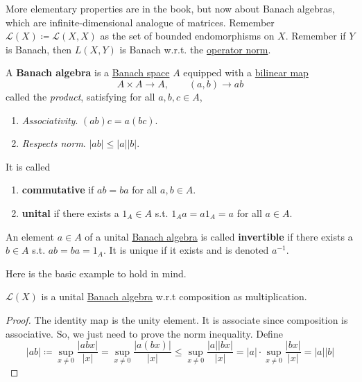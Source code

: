 	More elementary properties are in the book, but now about Banach algebras, which are infinite-dimensional analogue of matrices. Remember $\mathcal{L}(X) \coloneqq \mathcal{L}(X, X)$ as the set of bounded endomorphisms on $X$. Remember if $Y$ is Banach, then $L(X, Y)$ is Banach w.r.t. the \hyperref[lin-def:operator-norm-2]{operator norm}. 

	\begin{definition}
	  \label{def:banach-algebra}
	  A \textbf{Banach algebra} is a \hyperref[mv-def:banach-space]{Banach space} $A$ equipped with a \hyperref[lin-def:bilinear-map]{bilinear map} 
		\begin{equation}
		  A \times A \to A, \qquad (a, b) \to ab
		\end{equation}
		called the \textit{product}, satisfying for all $a, b, c \in A$, 
		\begin{enumerate}
		  \item \textit{Associativity}. $(ab)c = a(bc)$. 
			\item \textit{Respects norm}. $|ab| \leq |a| |b|$. 
		\end{enumerate}
		It is called 
		\begin{enumerate}
		  \item \textbf{commutative} if $ab = ba$ for all $a, b \in A$. 
			\item \textbf{unital} if there exists a $1_A \in A$ s.t. $1_A a = a 1_A = a$ for all $a \in A$. 
		\end{enumerate}
	\end{definition}

	\begin{definition}
	  \label{def:invertible-element-of-a-banach-algebra}
		An element $a \in A$ of a unital \hyperref[def:banach-algebra]{Banach algebra} is called \textbf{invertible} if there exists a $b \in A$ s.t. $ab = ba = 1_A$. It is unique if it exists and is denoted $a^{-1}$. 
	\end{definition}

	Here is the basic example to hold in mind. 

	\begin{theorem}
	  \label{thm:banach-algebra-of-bounded-linear-endomorphisms}
		$\mathcal{L}(X)$ is a unital \hyperref[def:banach-algebra]{Banach algebra} w.r.t composition as multiplication. 
	\end{theorem}
	\begin{proof}
	  The identity map is the unity element. It is associate since composition is associative. So, we just need to prove the norm inequality. Define 
		\begin{equation}
			|ab| \coloneqq \sup_{x \neq 0} \frac{|abx|}{|x|} = \sup_{x \neq 0} \frac{|a(bx)|}{|x|} \leq \sup_{x \neq 0} \frac{|a| |bx|}{|x|} = |a| \cdot \sup_{x \neq 0} \frac{|bx|}{|x|} = |a| |b|
		\end{equation}
	\end{proof}

